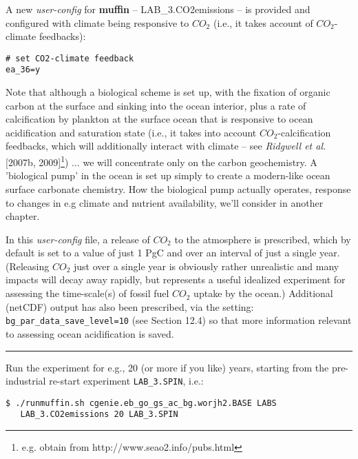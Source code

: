 \documentclass[11pt,fleqn]{book} %
\begin{document}
A new \textit{user-config} for \textbf{muffin} -- \footnotesize\textsf{LAB\_3.CO2emissions }\normalsize -- is provided and configured with climate being responsive to \(CO_{2}\) (i.e., it takes account of \(CO_{2}\)-climate feedbacks):
\vspace{-2pt}\begin{verbatim}
# set CO2-climate feedback
ea_36=y
\end{verbatim}\vspace{-2pt}
\noindent Note that although a biological scheme is set up, with the fixation of organic carbon at the surface and sinking into the ocean interior, plus a rate of calcification by plankton at the surface ocean that is responsive to ocean acidification and saturation state (i.e., it takes into account \(CO_{2}\)-calcification feedbacks, which will additionally interact with climate – see \textit{Ridgwell et al.} [2007b, 2009]\footnote{e.g. obtain from http://www.seao2.info/pubs.html}) ... we will concentrate only on the carbon geochemistry. A 'biological pump' in the ocean is set up simply to create a modern-like ocean surface carbonate chemistry. How the biological pump actually operates, response to changes in e.g climate and nutrient availability, we'll consider in another chapter.

In this \textit{user-config} file, a release of \(CO_{2}\) to the atmosphere is prescribed, which by default is set to a value of just 1 PgC and over an interval of just a single year. (Releasing \(CO_{2}\) just over a single year is obviously rather unrealistic and many impacts will decay away rapidly, but represents a useful idealized experiment for assessing the time-scale(s) of fossil fuel \(CO_{2}\) uptake by the ocean.) Additional (netCDF) output has also been prescribed, via the setting: \texttt{bg\_par\_data\_save\_level=10} (see Section 12.4) so that more information relevant to assessing ocean acidification is saved.

\vspace{1mm}
\noindent\rule{4cm}{0.1mm}
\vspace{2mm}

\noindent Run the experiment for e.g., 20 (or more if you like) years, starting from the pre-industrial re-start experiment \texttt{LAB\_3.SPIN}, i.e.:
\vspace{-2pt}\begin{verbatim}
$ ./runmuffin.sh cgenie.eb_go_gs_ac_bg.worjh2.BASE LABS
   LAB_3.CO2emissions 20 LAB_3.SPIN
\end{verbatim}\vspace{-2pt}
\end{document}
